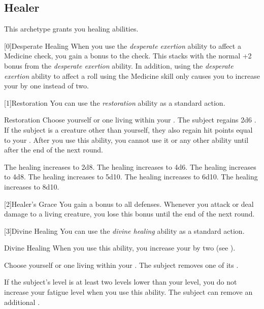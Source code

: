    \newpage
    \subsection{Healer}
        This archetype grants you healing abilities.

        [0]{Desperate Healing} When you use the \textit{desperate exertion} ability to affect a Medicine check, you gain a  bonus to the check.
        This stacks with the normal +2 bonus from the \textit{desperate exertion} ability.
        In addition, using the \textit{desperate exertion} ability to affect a roll using the Medicine skill only causes you to increase your  by one instead of two.

        [1]{Restoration} You can use the \textit{restoration} ability as a standard action.
        \begin{instantability}{Restoration}
            \rankline
            Choose yourself or one living  within your .
            The subject regains 2d6 .
            If the subject is a creature other than yourself, they also regain hit points equal to your .
            After you use this ability, you cannot use it or any other  ability until after the end of the next round.

            \rankline
             The healing increases to 2d8.
             The healing increases to 4d6.
             The healing increases to 4d8.
             The healing increases to 5d10.
             The healing increases to 6d10.
             The healing increases to 8d10.
        \end{instantability}

        [2]{Healer's Grace} You gain a  bonus to all defenses.
        Whenever you attack or deal damage to a living creature, you lose this bonus until the end of the next round.

        [3]{Divine Healing} You can use the \textit{divine healing} ability as a standard action.
        \begin{instantability}{Divine Healing}
            \rankline
            When you use this ability, you increase your  by two (see ).

            Choose yourself or one living  within your .
            The subject removes one of its .

            \rankline
             If the subject's level is at least two levels lower than your level,
                you do not increase your fatigue level when you use this ability.
             The subject can remove an additional .
        \end{instantability}

